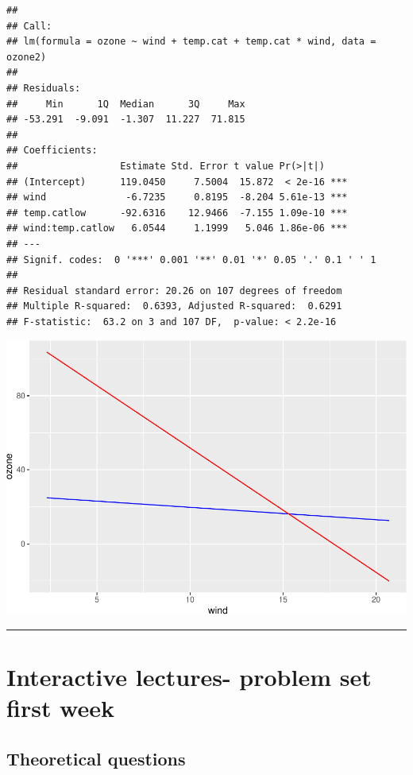 \documentclass[
]{article}
\begin{document}
\begin{verbatim}
## 
## Call:
## lm(formula = ozone ~ wind + temp.cat + temp.cat * wind, data = ozone2)
## 
## Residuals:
##     Min      1Q  Median      3Q     Max 
## -53.291  -9.091  -1.307  11.227  71.815 
## 
## Coefficients:
##                  Estimate Std. Error t value Pr(>|t|)    
## (Intercept)      119.0450     7.5004  15.872  < 2e-16 ***
## wind              -6.7235     0.8195  -8.204 5.61e-13 ***
## temp.catlow      -92.6316    12.9466  -7.155 1.09e-10 ***
## wind:temp.catlow   6.0544     1.1999   5.046 1.86e-06 ***
## ---
## Signif. codes:  0 '***' 0.001 '**' 0.01 '*' 0.05 '.' 0.1 ' ' 1
## 
## Residual standard error: 20.26 on 107 degrees of freedom
## Multiple R-squared:  0.6393, Adjusted R-squared:  0.6291 
## F-statistic:  63.2 on 3 and 107 DF,  p-value: < 2.2e-16
\end{verbatim}

\includegraphics{2MLR_files/figure-latex/unnamed-chunk-25-1.pdf}

\begin{center}\rule{0.5\linewidth}{0.5pt}\end{center}

\hypertarget{interactive-lectures--problem-set-first-week}{%
\section{Interactive lectures- problem set first
week}\label{interactive-lectures--problem-set-first-week}}

\hypertarget{theoretical-questions}{%
\subsection{Theoretical questions}\label{theoretical-questions}}
\end{document}
